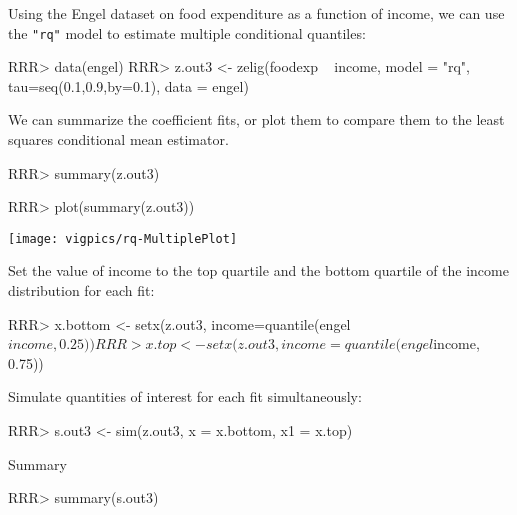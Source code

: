 \begin{enumerate}
Using the Engel dataset on food expenditure as a function of income, we can use the
{\tt "rq"} model to estimate multiple conditional quantiles: 
\begin{Schunk}
\begin{Sinput}
RRR>  data(engel)
RRR>  z.out3 <- zelig(foodexp ~ income, model = "rq", tau=seq(0.1,0.9,by=0.1), data = engel)
\end{Sinput}
\end{Schunk}
We can summarize the coefficient fits, or plot them to compare them to the least squares
conditional mean estimator.
\begin{Schunk}
\begin{Sinput}
RRR>  summary(z.out3)
\end{Sinput}
\end{Schunk}
\begin{center}
\begin{Schunk}
\begin{Sinput}
RRR>  plot(summary(z.out3))
\end{Sinput}
\end{Schunk}
\texttt{[image: vigpics/rq-MultiplePlot]}
\end{center}
Set the value of income to the top quartile and the bottom quartile of 
the income distribution for each fit:
\begin{Schunk}
\begin{Sinput}
RRR>  x.bottom <- setx(z.out3, income=quantile(engel$income, 0.25))
RRR>  x.top <- setx(z.out3, income=quantile(engel$income, 0.75))
\end{Sinput}
\end{Schunk}
Simulate quantities of interest for each fit simultaneously:
\begin{Schunk}
\begin{Sinput}
RRR>  s.out3 <- sim(z.out3, x = x.bottom, x1 = x.top)
\end{Sinput}
\end{Schunk}
Summary
\begin{Schunk}
\begin{Sinput}
RRR> summary(s.out3)
\end{Sinput}
\end{Schunk}

\end{enumerate}

